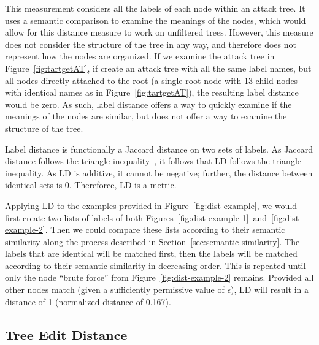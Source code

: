 This measurement considers all the labels of each node within an attack tree. It uses a semantic comparison to examine the meanings of the nodes, which would allow for this distance measure to work on unfiltered trees. However, this measure does not consider the structure of the tree in any way, and therefore does not represent how the nodes are organized. If we examine the attack tree in Figure~\ref{fig:tartgetAT}, if create an attack tree with all the same label names, but all nodes directly attached to the root (a single root node with 13 child nodes with identical names as in Figure~\ref{fig:tartgetAT}), the resulting label distance would be zero. As such, label distance offers a way to quickly examine if the meanings of the nodes are similar, but does not offer a way to examine the structure of the tree. 

Label distance is functionally a Jaccard distance on two sets of labels. As Jaccard distance follows the triangle inequality~\cite{kosub2019note}, it follows that LD follows the triangle inequality. As LD is additive, it cannot be negative; further, the distance between identical sets is 0. Thereforce, LD is a metric.


Applying LD to the examples provided in Figure~\ref{fig:dist-example}, we would first create two lists of labels of both Figures~\ref{fig:dist-example-1}~and~\ref{fig:dist-example-2}. Then we could compare these lists according to their semantic similarity along the process described in Section~\ref{sec:semantic-similarity}. The labels that are identical will be matched first, then the labels will be matched according to their semantic similarity in decreasing order. This is repeated until only the node ``brute force'' from Figure~\ref{fig:dist-example-2} remains. Provided all other nodes match (given a sufficiently permissive value of $\epsilon$), LD will result in a distance of 1 (normalized distance of 0.167).



\subsection{Tree Edit Distance}
\label{ssec:ted}

